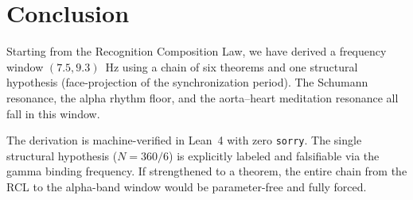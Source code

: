 \documentclass[11pt,a4paper]{article}
\begin{document}
\section{Conclusion}
\label{sec:conclusion}

Starting from the Recognition Composition Law, we have derived a
frequency window $(7.5,9.3)$~Hz using a chain of six theorems and one
structural hypothesis (face-projection of the synchronization period).
The Schumann resonance, the alpha rhythm floor, and the aorta--heart
meditation resonance all fall in this window.

The derivation is machine-verified in Lean~4 with zero \texttt{sorry}.
The single structural hypothesis ($N = 360/6$) is explicitly labeled
and falsifiable via the gamma binding frequency. If strengthened to a
theorem, the entire chain from the RCL to the alpha-band window would
be parameter-free and fully forced.
\end{document}
